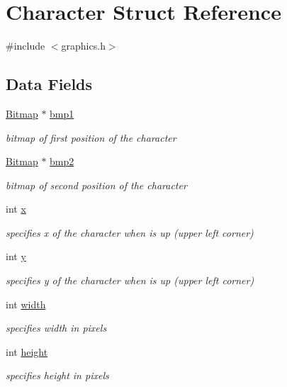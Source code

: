 \hypertarget{struct_character}{}\section{Character Struct Reference}
\label{struct_character}


{\ttfamily \#include $<$graphics.\+h$>$}

\subsection*{Data Fields}
\begin{DoxyCompactItemize}
\item 
\hyperlink{struct_bitmap}{Bitmap} $\ast$ \hyperlink{struct_character_ace0800db034f28906f5865a455ffe263}{bmp1}
\begin{DoxyCompactList}\small\item\em bitmap of first position of the character \end{DoxyCompactList}\item 
\hyperlink{struct_bitmap}{Bitmap} $\ast$ \hyperlink{struct_character_a7610f0716dcba2fee8823ea505b09e00}{bmp2}
\begin{DoxyCompactList}\small\item\em bitmap of second position of the character \end{DoxyCompactList}\item 
int \hyperlink{struct_character_a6150e0515f7202e2fb518f7206ed97dc}{x}
\begin{DoxyCompactList}\small\item\em specifies x of the character when is up (upper left corner) \end{DoxyCompactList}\item 
int \hyperlink{struct_character_a0a2f84ed7838f07779ae24c5a9086d33}{y}
\begin{DoxyCompactList}\small\item\em specifies y of the character when is up (upper left corner) \end{DoxyCompactList}\item 
int \hyperlink{struct_character_a2474a5474cbff19523a51eb1de01cda4}{width}
\begin{DoxyCompactList}\small\item\em specifies width in pixels \end{DoxyCompactList}\item 
int \hyperlink{struct_character_ad12fc34ce789bce6c8a05d8a17138534}{height}
\begin{DoxyCompactList}\small\item\em specifies height in pixels \end{DoxyCompactList}\end{DoxyCompactItemize}


